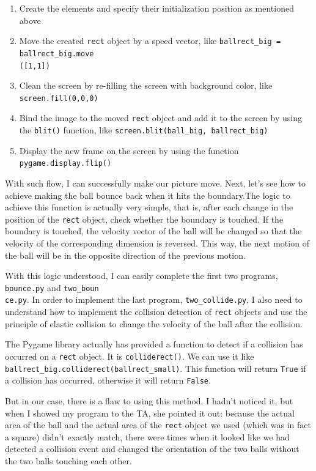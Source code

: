 \documentclass[12pt]{report}
\newcommand{\code}[1]{\colorbox{light-gray}{\texttt{#1}}}
\begin{document}
\begin{enumerate}
    \item Create the elements and specify their initialization position as mentioned above
    \item Move the created \code{rect} object by a speed vector, like \code{ballrect\_big = ballrect\_big.move}\\\code{([1,1])}
    \item Clean the screen by re-filling the screen with background color, like \code{screen.fill(0,0,0)}
    \item Bind the image to the moved \code{rect} object and add it to the screen by using the \code{blit()} function, like \code{screen.blit(ball\_big, ballrect\_big)}
    \item Display the new frame on the screen by using the function \code{pygame.display.flip()}
\end{enumerate}\vspace{-1em}
With such flow, I can successfully make our picture move. Next, let's see how to achieve making the ball bounce back when it hits the boundary.The logic to achieve this function is actually very simple, that is, after each change in the position of the \code{rect} object, check whether the boundary is touched. If the boundary is touched, the velocity vector of the ball will be changed so that the velocity of the corresponding dimension is reversed. This way, the next motion of the ball will be in the opposite direction of the previous motion.\par
With this logic understood, I can easily complete the first two programs, \code{bounce.py} and \code{two\_boun}\\\code{ce.py}. In order to implement the last program, \code{two\_collide.py}, I also need to understand how to implement the collision detection of \code{rect} objects and use the principle of elastic collision to change the velocity of the ball after the collision.\par
The Pygame library actually has provided a function to detect if a collision has occurred on a \code{rect} object. It is \code{colliderect()}. We can use it like \code{ballrect\_big.colliderect(ballrect\_small)}. This function will return \code{True} if a collision has occurred, otherwise it will return \code{False}.\par
But in our case, there is a flaw to using this method. I hadn't noticed it, but when I showed my program to the TA, she pointed it out: because the actual area of the ball and the actual area of the \code{rect} object we used (which was in fact a square) didn't exactly match, there were times when it looked like we had detected a collision event and changed the orientation of the two balls without the two balls touching each other.\par
\end{document}
